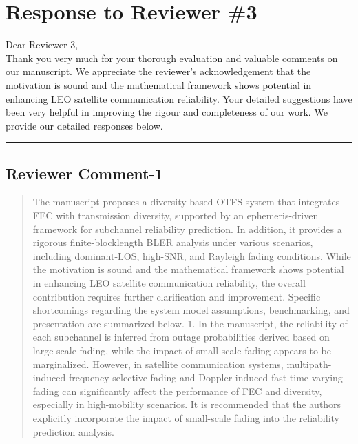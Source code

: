 \section{Response to Reviewer \#3}

Dear Reviewer 3,\\

Thank you very much for your thorough evaluation and valuable comments on our manuscript. We appreciate the reviewer's acknowledgement that the motivation is sound and the mathematical framework shows potential in enhancing LEO satellite communication reliability. Your detailed suggestions have been very helpful in improving the rigour and completeness of our work. We provide our detailed responses below.

\noindent\rule{17cm}{2.0pt}

\subsection{Reviewer Comment-1}



\begin{mdframed}
\begin{quote}
The manuscript proposes a diversity-based OTFS system that integrates FEC with transmission diversity, supported by an ephemeris-driven framework for subchannel reliability prediction. In addition, it provides a rigorous finite-blocklength BLER analysis under various scenarios, including dominant-LOS, high-SNR, and Rayleigh fading conditions. While the motivation is sound and the mathematical framework shows potential in enhancing LEO satellite communication reliability, the overall contribution requires further clarification and improvement. Specific shortcomings regarding the system model assumptions, benchmarking, and presentation are summarized below.
1. In the manuscript, the reliability of each subchannel is inferred from outage probabilities derived based on large-scale fading, while the impact of small-scale fading appears to be marginalized. However, in satellite communication systems, multipath-induced frequency-selective fading and Doppler-induced fast time-varying fading can significantly affect the performance of FEC and diversity, especially in high-mobility scenarios. It is recommended that the authors explicitly incorporate the impact of small-scale fading into the reliability prediction analysis.


\end{quote}

\end{mdframed}


